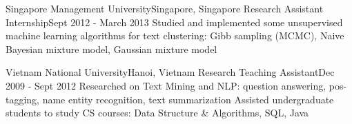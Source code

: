     \resumeSubheading
      {Singapore Management University}{Singapore, Singapore}
      {Research Assistant Internship}{Sept 2012 - March 2013}
      \resumeItemListStart
          {Studied and implemented some unsupervised machine learning algorithms for text clustering: Gibb sampling (MCMC), Naive Bayesian mixture model, Gaussian mixture model}
      \resumeItemListEnd

    \resumeSubheading
      {Vietnam National University}{Hanoi, Vietnam}
      {Research Teaching Assistant}{Dec 2009 - Sept 2012}
      \resumeItemListStart
          {Researched on Text Mining and NLP: question answering, pos-tagging, name entity recognition, text summarization}
          {Assisted undergraduate students to study CS courses: Data Structure \& Algorithms, SQL, Java}
      \resumeItemListEnd

  \resumeSubHeadingListEnd